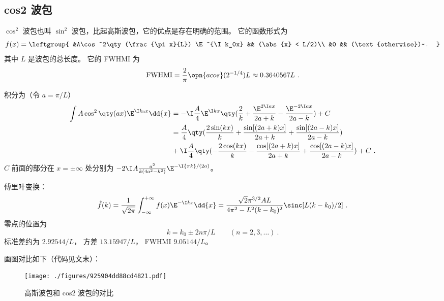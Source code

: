\subsection{cos2 波包}
$\cos^2$ 波包也叫 $\sin^2$ 波包，比起高斯波包，它的优点是存在明确的范围。 它的函数形式为
\begin{equation}\label{eq_GausPk_5}
f(x) = \leftgroup{
&A\cos^2\qty(\frac{\pi x}{L}) \E^{\I k_0x} && (\abs{x} < L/2)\\
&0 && (\text{otherwise})~.
}\end{equation}
其中 $L$ 是波包的总长度。 它的 FWHMI 为
\begin{equation}\label{eq_GausPk_4} %
\text{FWHMI} = \frac{2}{\pi}\opn{acos}(2^{-1/4}) L \approx 0.3640567 L~.
\end{equation}

积分为（令 $a = \pi/L$）
\begin{equation}\label{eq_GausPk_2} %
\begin{aligned}
\int A\cos^2\qty(a x) \E^{\I k_0x} \dd{x} &= -\I\frac{A}{4}\E^{\I kx}\qty(\frac{2}{k} +\frac{\E^{2\I ax}}{2a+k} -\frac{\E^{-2\I ax}}{2a-k}) + C\\
&= \frac{A}{4} \qty(\frac{2\sin(k x)}{k} +\frac{\sin[(2 a+k)x]}{2 a+k} +\frac{\sin[(2 a-k)x]}{2 a-k})\\
&+\I\frac{A}{4} \qty(-\frac{2\cos(k x)}{k} -\frac{\cos[(2 a+k)x]}{2 a+k} +\frac{\cos[(2 a-k)x]}{2 a-k}) + C~.
\end{aligned}
\end{equation}
$C$ 前面的部分在 $x = \pm\infty$ 处分别为 $-2\I A\frac{a^2}{k(4 a^2 -k^2)}\E^{-\I{\pi k}/{(2a)}}$。

傅里叶变换：
\begin{equation} %
\tilde f(k) = \frac{1}{\sqrt{2\pi}} \int_{-\infty}^{+\infty} f(x) \E^{-\I k x} \dd{x}
= \frac{\sqrt{2} \pi ^{3/2} A L}{4 \pi ^2-L^2 (k-k_0)^2} \sinc[L(k-k_0)/2]~.
\end{equation}
零点的位置为
\begin{equation}
k = k_0 \pm 2n\pi/L \qquad (n=2,3,\dots)~.
\end{equation}
标准差约为 $2.92544/L$， 方差 $13.15947/L$， FWHMI $9.05144/L$。

画图对比如下（代码见文末）：
\begin{figure}[ht]
\centering
\texttt{[image: ./figures/925904dd88cd4821.pdf]}
\caption{高斯波包和 cos2 波包的对比} \label{fig_GausPk_2}
\end{figure}

